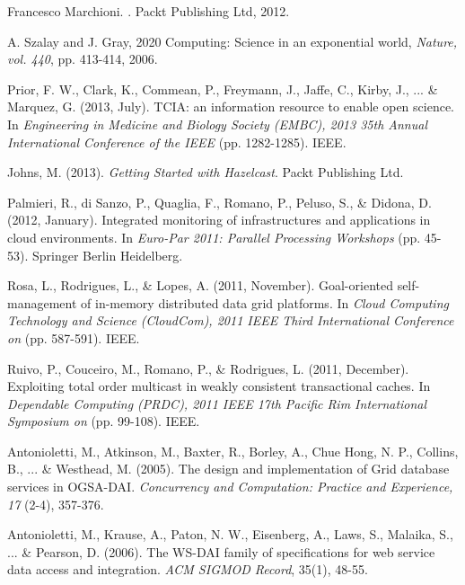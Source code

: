 \documentclass[conference]{IEEEtran}
\begin{document}

\begin{thebibliography}{1}
	\scriptsize{
		
Francesco Marchioni.
.
\newblock Packt Publishing Ltd, 2012.

 A. Szalay and J. Gray, 2020 Computing: Science in an exponential world, {\em Nature, vol. 440}, pp. 413-414, 2006.

Prior, F. W., Clark, K., Commean, P., Freymann, J., Jaffe, C., Kirby, J., ... \& Marquez, G. (2013, July). TCIA: an information resource to enable open science. In {\em Engineering in Medicine and Biology Society (EMBC), 2013 35th Annual International Conference of the IEEE} (pp. 1282-1285). IEEE.

 Johns, M. (2013). {\em Getting Started with Hazelcast}. Packt Publishing Ltd.

 Palmieri, R., di Sanzo, P., Quaglia, F., Romano, P., Peluso, S., \& Didona, D. (2012, January). Integrated monitoring of infrastructures and applications in cloud environments. In {\em Euro-Par 2011: Parallel Processing Workshops} (pp. 45-53). Springer Berlin Heidelberg.

Rosa, L., Rodrigues, L., \& Lopes, A. (2011, November). Goal-oriented self-management of in-memory distributed data grid platforms. In {\em Cloud Computing Technology and Science (CloudCom), 2011 IEEE Third International Conference on} (pp. 587-591). IEEE.

 Ruivo, P., Couceiro, M., Romano, P., \& Rodrigues, L. (2011, December). Exploiting total order multicast in weakly consistent transactional caches. In {\em Dependable Computing (PRDC), 2011 IEEE 17th Pacific Rim International Symposium on} (pp. 99-108). IEEE.

 Antonioletti, M., Atkinson, M., Baxter, R., Borley, A., Chue Hong, N. P., Collins, B., ... \& Westhead, M. (2005). The design and implementation of Grid database services in OGSA-DAI. {\em  Concurrency and Computation: Practice and Experience, 17} (2-4), 357-376.

 Antonioletti, M., Krause, A., Paton, N. W., Eisenberg, A., Laws, S., Malaika, S., ... \& Pearson, D. (2006). The WS-DAI family of specifications for web service data access and integration. {\em ACM SIGMOD Record}, 35(1), 48-55.
}
\end{thebibliography}
\end{document}

